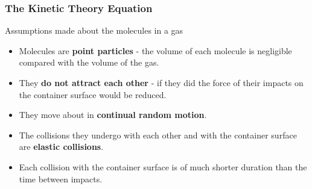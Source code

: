 \subsubsection*{The Kinetic Theory Equation}

Assumptions made about the molecules in a gas
\begin{itemize}
    \item Molecules are \textbf{point particles} - the volume of each molecule is negligible compared with the volume of the gas.
    \item They \textbf{do not attract each other} - if they did the force of their impacts on the container surface would be reduced.
    \item They move about in \textbf{continual random motion}.
    \item The collisions they undergo with each other and with the container surface are \textbf{elastic collisions}.
    \item Each collision with the container surface is of much shorter duration than the time between impacts.
\end{itemize}

